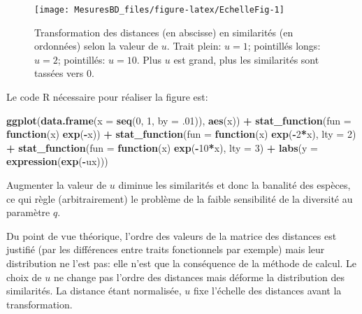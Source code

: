 \documentclass[
  11pt,
  french,
  a4paper,
  extrafontsizes,onecolumn,openright
  ]{memoir}
\newenvironment{Shaded}{\begin{snugshade}}{\end{snugshade}}
\newcommand{\ControlFlowTok}[1]{\textcolor[rgb]{0.13,0.29,0.53}{\textbf{#1}}}
\newcommand{\DataTypeTok}[1]{\textcolor[rgb]{0.13,0.29,0.53}{#1}}
\newcommand{\DecValTok}[1]{\textcolor[rgb]{0.00,0.00,0.81}{#1}}
\newcommand{\FloatTok}[1]{\textcolor[rgb]{0.00,0.00,0.81}{#1}}
\newcommand{\KeywordTok}[1]{\textcolor[rgb]{0.13,0.29,0.53}{\textbf{#1}}}
\newcommand{\NormalTok}[1]{#1}
\newcommand{\OperatorTok}[1]{\textcolor[rgb]{0.81,0.36,0.00}{\textbf{#1}}}
\newcommand{\StringTok}[1]{\textcolor[rgb]{0.31,0.60,0.02}{#1}}
\begin{document}
\scriptsize

\begin{figure}

{\centering \texttt{[image: MesuresBD\_files/figure-latex/EchelleFig-1]} 

}

\caption{Transformation des distances (en abscisse) en similarités (en ordonnées) selon la valeur de \(u\). Trait plein: \(u=1\); pointillés longs: \(u=2\); pointillés: \(u=10\). Plus \(u\) est grand, plus les similarités sont tassées vers 0.}\label{fig:EchelleFig}
\end{figure}

\normalsize

Le code R nécessaire pour réaliser la figure est:

\scriptsize

\begin{Shaded}
\begin{Highlighting}[]
\KeywordTok{ggplot}\NormalTok{(}\KeywordTok{data.frame}\NormalTok{(}\DataTypeTok{x =} \KeywordTok{seq}\NormalTok{(}\DecValTok{0}\NormalTok{, }\DecValTok{1}\NormalTok{, }\DataTypeTok{by =} \FloatTok{.01}\NormalTok{)), }\KeywordTok{aes}\NormalTok{(x)) }\OperatorTok{+}\StringTok{ }
\StringTok{  }\KeywordTok{stat_function}\NormalTok{(}\DataTypeTok{fun =} \ControlFlowTok{function}\NormalTok{(x) }\KeywordTok{exp}\NormalTok{(}\OperatorTok{-}\NormalTok{x)) }\OperatorTok{+}
\StringTok{  }\KeywordTok{stat_function}\NormalTok{(}\DataTypeTok{fun =} \ControlFlowTok{function}\NormalTok{(x) }\KeywordTok{exp}\NormalTok{(}\OperatorTok{-}\DecValTok{2}\OperatorTok{*}\NormalTok{x), }\DataTypeTok{lty =} \DecValTok{2}\NormalTok{) }\OperatorTok{+}
\StringTok{  }\KeywordTok{stat_function}\NormalTok{(}\DataTypeTok{fun =} \ControlFlowTok{function}\NormalTok{(x) }\KeywordTok{exp}\NormalTok{(}\OperatorTok{-}\DecValTok{10}\OperatorTok{*}\NormalTok{x), }\DataTypeTok{lty =} \DecValTok{3}\NormalTok{) }\OperatorTok{+}
\StringTok{  }\KeywordTok{labs}\NormalTok{(}\DataTypeTok{y =} \KeywordTok{expression}\NormalTok{(}\KeywordTok{exp}\NormalTok{(}\OperatorTok{-}\NormalTok{ux)))}
\end{Highlighting}
\end{Shaded}

\normalsize

Augmenter la valeur de \(u\) diminue les similarités et donc la banalité des espèces, ce qui règle (arbitrairement) le problème de la faible sensibilité de la diversité au paramètre \(q\).

Du point de vue théorique, l'ordre des valeurs de la matrice des distances est justifié (par les différences entre traits fonctionnels par exemple) mais leur distribution ne l'est pas: elle n'est que la conséquence de la méthode de calcul.
Le choix de \(u\) ne change pas l'ordre des distances mais déforme la distribution des similarités.
La distance étant normalisée, \(u\) fixe l'échelle des distances avant la transformation.
\end{document}

